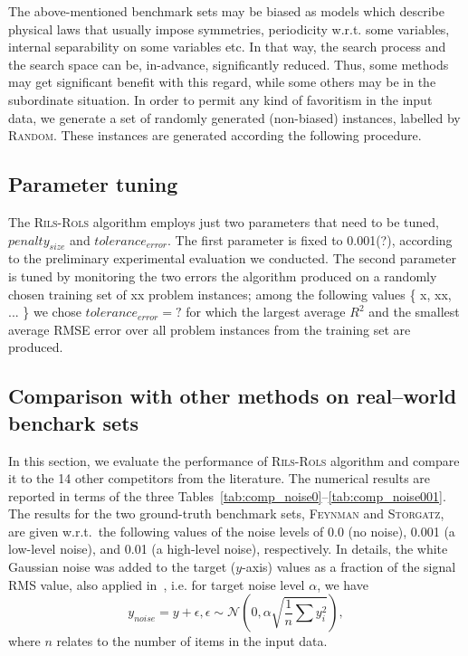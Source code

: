 \documentclass[a4paper,12pt]{elsarticle}
\begin{document}
The above-mentioned benchmark sets may be biased as models which describe physical laws that usually impose   symmetries, periodicity w.r.t. some variables, internal separability on some variables etc. In that way, the search process and the search space can be, in-advance, significantly reduced. Thus, some methods may get significant benefit with this regard, while some others may be in the subordinate situation. 
In order to permit any kind of favoritism in the input data, we generate a set of randomly generated (non-biased) instances, labelled by \textsc{Random}. These instances are generated according the following procedure. 


\subsection{Parameter tuning}
The \textsc{Rils}-\textsc{Rols} algorithm employs just two parameters that need to be tuned, $penalty_{size}$ and $tolerance_{error}$. The first parameter is fixed to 0.001(?), according to the preliminary experimental evaluation we conducted. The second parameter is tuned by monitoring the two errors the algorithm produced on a randomly chosen training set of xx problem instances; among the following values \{ x, xx, ... \} we chose $tolerance_{error}=?$ for which the largest average $R^2$ and the smallest average RMSE error over all problem instances from the training set are produced. %


\subsection{Comparison with other methods on real--world benchark sets}
In this section, we evaluate the performance of \textsc{Rils-Rols} algorithm and compare it to the 14 other competitors from the literature. The numerical results are reported in terms of the three Tables~\ref{tab:comp_noise0}--\ref{tab:comp_noise001}. The results for the two ground-truth benchmark sets, \textsc{Feynman} and \textsc{Storgatz}, are given w.r.t.\   the following values of the noise levels of 0.0 (no noise), 0.001 (a low-level noise), and 0.01 (a high-level noise), respectively. In details, the white Gaussian noise was added to the target ($y$-axis) values as a fraction of the signal RMS value, also applied in~\cite{la2021contemporary}, i.e. for target noise level $\alpha$, we have
$$ y_{noise} = y + \epsilon, \epsilon \sim \mathcal{N}\left(0, \alpha \sqrt{\frac{1}{n} \sum {y_i^2}}\right),$$
where $n$ relates to the number of items in the input data.
\end{document}
